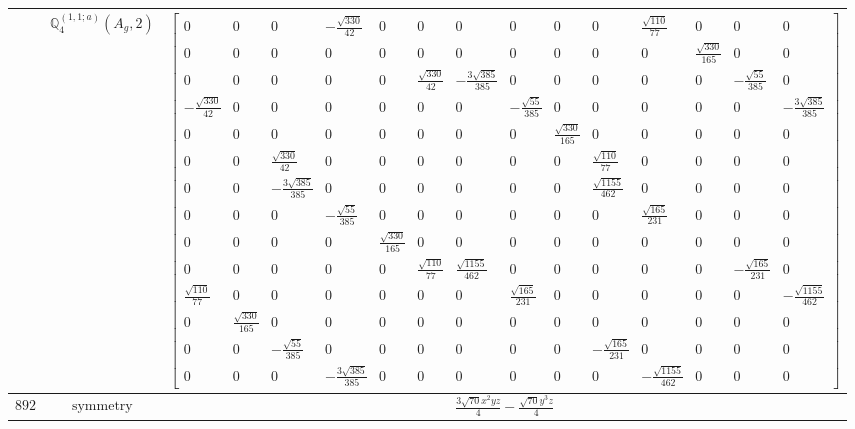 \documentclass[fleqn,8pt,landscape]{jsarticle}
\begin{document}
\begin{longtable}{ccc}
$  $ & $ \mathbb{Q}_{4}^{(1,1;a)}(A_{g},2) $ & $ \begin{bmatrix} 0 & 0 & 0 & - \frac{\sqrt{330}}{42} & 0 & 0 & 0 & 0 & 0 & 0 & \frac{\sqrt{110}}{77} & 0 & 0 & 0 \\ 0 & 0 & 0 & 0 & 0 & 0 & 0 & 0 & 0 & 0 & 0 & \frac{\sqrt{330}}{165} & 0 & 0 \\ 0 & 0 & 0 & 0 & 0 & \frac{\sqrt{330}}{42} & - \frac{3 \sqrt{385}}{385} & 0 & 0 & 0 & 0 & 0 & - \frac{\sqrt{55}}{385} & 0 \\ - \frac{\sqrt{330}}{42} & 0 & 0 & 0 & 0 & 0 & 0 & - \frac{\sqrt{55}}{385} & 0 & 0 & 0 & 0 & 0 & - \frac{3 \sqrt{385}}{385} \\ 0 & 0 & 0 & 0 & 0 & 0 & 0 & 0 & \frac{\sqrt{330}}{165} & 0 & 0 & 0 & 0 & 0 \\ 0 & 0 & \frac{\sqrt{330}}{42} & 0 & 0 & 0 & 0 & 0 & 0 & \frac{\sqrt{110}}{77} & 0 & 0 & 0 & 0 \\ 0 & 0 & - \frac{3 \sqrt{385}}{385} & 0 & 0 & 0 & 0 & 0 & 0 & \frac{\sqrt{1155}}{462} & 0 & 0 & 0 & 0 \\ 0 & 0 & 0 & - \frac{\sqrt{55}}{385} & 0 & 0 & 0 & 0 & 0 & 0 & \frac{\sqrt{165}}{231} & 0 & 0 & 0 \\ 0 & 0 & 0 & 0 & \frac{\sqrt{330}}{165} & 0 & 0 & 0 & 0 & 0 & 0 & 0 & 0 & 0 \\ 0 & 0 & 0 & 0 & 0 & \frac{\sqrt{110}}{77} & \frac{\sqrt{1155}}{462} & 0 & 0 & 0 & 0 & 0 & - \frac{\sqrt{165}}{231} & 0 \\ \frac{\sqrt{110}}{77} & 0 & 0 & 0 & 0 & 0 & 0 & \frac{\sqrt{165}}{231} & 0 & 0 & 0 & 0 & 0 & - \frac{\sqrt{1155}}{462} \\ 0 & \frac{\sqrt{330}}{165} & 0 & 0 & 0 & 0 & 0 & 0 & 0 & 0 & 0 & 0 & 0 & 0 \\ 0 & 0 & - \frac{\sqrt{55}}{385} & 0 & 0 & 0 & 0 & 0 & 0 & - \frac{\sqrt{165}}{231} & 0 & 0 & 0 & 0 \\ 0 & 0 & 0 & - \frac{3 \sqrt{385}}{385} & 0 & 0 & 0 & 0 & 0 & 0 & - \frac{\sqrt{1155}}{462} & 0 & 0 & 0 \end{bmatrix} $ \\ \hline
$ 892 $ & $ \text{symmetry} $ & $ \frac{3 \sqrt{70} x^{2} y z}{4} - \frac{\sqrt{70} y^{3} z}{4} $ \\

\end{longtable}
\end{document}

